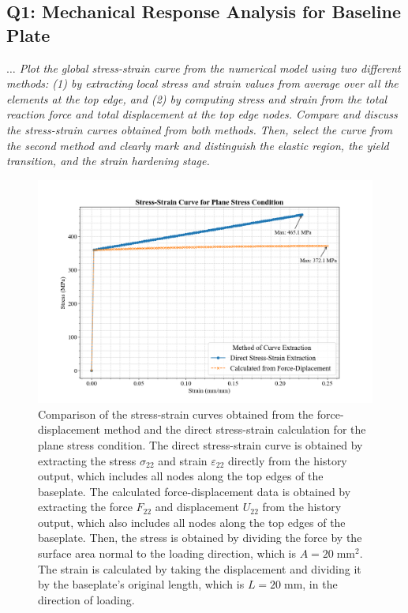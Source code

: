 \documentclass[12pt]{article}
\begin{document}
\subsection*{Q1: Mechanical Response Analysis for Baseline Plate}

\textit{$\dots$ Plot the global stress-strain curve from the numerical model using two different methods: (1)
by extracting local stress and strain values from average over all the elements at the top edge,
and (2) by computing stress and strain from the total reaction force and total displacement at
the top edge nodes. Compare and discuss the stress-strain curves obtained from both methods.
Then, select the curve from the second method and clearly mark and distinguish the elastic
region, the yield transition, and the strain hardening stage.}

\begin{figure}[H]
    \centering
    \includegraphics[width=1\textwidth]{visualize_tensileGraph/res/comparison_direct_calculated.png}
    \caption{Comparison of the stress-strain curves obtained from the force-displacement method and the direct stress-strain calculation 
    for the plane stress condition. The direct stress-strain curve is obtained by extracting the stress $\sigma_{22}$ 
    and strain $\varepsilon_{22}$ directly from the history output, which includes all nodes along the top edges of the baseplate. 
    The calculated force-displacement data is obtained by extracting the force $F_{22}$ and displacement $U_{22}$ from the 
    history output, which also includes all nodes along the top edges of the baseplate.
Then, the stress is obtained by dividing the force by the surface area normal to the loading direction, which is
$A=20 \; \text{mm}^2$. The strain is calculated by taking the displacement and dividing it by the baseplate's original length, which is 
$L=20 \; \text{mm}$, in the direction of loading.} 
    \label{fig:ComparisonDirectCalculated}  
\end{figure}
\end{document}
